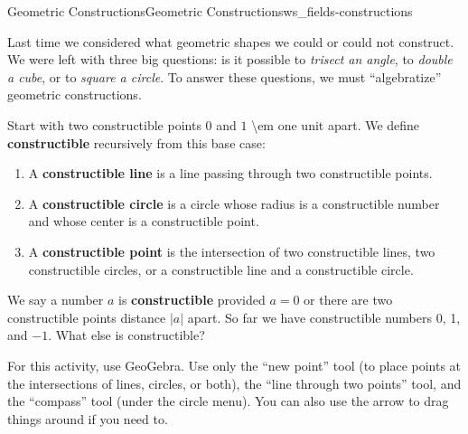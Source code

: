 \documentclass[oneside,11pt,]{article}
\title{}
\date{}
\newcommand{\terminology}[1]{\textbf{#1}}
\begin{document}
%
%
\typeout{************************************************}
\typeout{************************************************}
%
\begin{worksheet-section-numberless}{Geometric Constructions}{}{Geometric Constructions}{}{}{ws_fields-constructions}
\begin{introduction}{}%
\hypertarget{p-1}{}%
Last time we considered what geometric shapes we could or could not construct.  We were left with three big questions: is it possible to \emph{trisect an angle}, to \emph{double a cube}, or to \emph{square a circle}.  To answer these questions, we must ``algebratize'' geometric constructions.%
\par
\hypertarget{p-2}{}%
Start with two constructible points \(0\) and \(1\) \textbraceleft{}\textbackslash{}em one unit\textbraceright{} apart.  We define \terminology{constructible} recursively from this base case:\leavevmode%
\begin{enumerate}[label=(\alph*)]
\item\hypertarget{li-1}{}\hypertarget{p-3}{}%
A \terminology{constructible line} is a line passing through two constructible points.%
\item\hypertarget{li-2}{}\hypertarget{p-4}{}%
A \terminology{constructible circle} is a circle whose radius is a constructible number and whose center is a constructible point.%
\item\hypertarget{li-3}{}\hypertarget{p-5}{}%
A \terminology{constructible point} is the intersection of two constructible lines, two constructible circles, or a constructible line and a constructible circle.%
\end{enumerate}
%
\par
\hypertarget{p-6}{}%
We say a number \(a\) is \terminology{constructible} provided \(a = 0\) or there are two constructible points distance \(|a|\) apart.  So far we have constructible numbers 0, 1, and \(-1\).  What else is constructible?%
\par
\hypertarget{p-7}{}%
For this activity, use GeoGebra.  Use only the ``new point'' tool (to place points at the intersections of lines, circles, or both), the ``line through two points'' tool, and the ``compass'' tool (under the circle menu).  You can also use the arrow to drag things around if you need to.%
\end{introduction}%

\end{worksheet-section-numberless}
\end{document}
